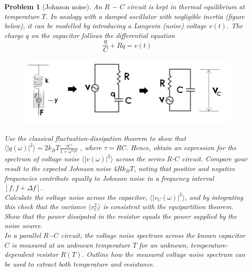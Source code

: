 \documentclass[a4paper]{article}
\theoremstyle{new2}
\theoremstyle{new}
\newtheorem{qns}{Problem}[section]
\begin{document}
\begin{qns}[Johnson noise]
An $R$ − $C$ circuit is kept in thermal equilibrium at temperature $T$. In analogy with a damped oscillator with negligible inertia (figure below), it can be modelled by introducing a Langevin (noise) voltage $v(t)$. The charge $q$ on the capacitor follows the differential equation
$$\frac{q}{C}+R\dot{q}=v(t)$$
\begin{figure}[H]
    \centering
    \includegraphics[width=\linewidth]{TSPEx4Q9.JPG}
\end{figure}
Use the classical fluctuation-dissipation theorem to show that $\langle|q(\omega)|^2\rangle=2k_BT\frac{\tau C}{1+\omega^2\tau^2}$ , where $\tau=RC$. Hence, obtain an expression for the spectrum of voltage noise $\langle|v(\omega)|^2\rangle$ across the series $R$-$C$ circuit. Compare your result to the expected Johnson noise $4Rk_BT$, noting that positive and negative frequencies contribute equally to Johnson noise in a frequency interval $[f,f + \Delta f]$.\\[5pt]
Calculate the voltage noise across the capacitor, $\langle|v_C(\omega)|^2\rangle$, and by integrating this check that the variance $\langle v_C^2\rangle$ is consistent with the equipartition theorem.\\[5pt]
Show that the power dissipated in the resistor equals the power supplied by the noise source.\\[5pt]
In a parallel $R$−$C$ circuit, the voltage noise spectrum across the known capacitor $C$ is measured at an unknown temperature $T$ for an unknown, temperature-dependent resistor $R(T)$. Outline how the measured voltage noise spectrum can be used to extract both temperature and resistance.
\end{qns}
\end{document}
